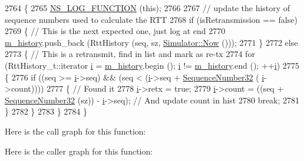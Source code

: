 \begin{DoxyCode}
2764 \{
2765   \hyperlink{log-macros-disabled_8h_a90b90d5bad1f39cb1b64923ea94c0761}{NS\_LOG\_FUNCTION} (\textcolor{keyword}{this});
2766 
2767   \textcolor{comment}{// update the history of sequence numbers used to calculate the RTT}
2768   \textcolor{keywordflow}{if} (isRetransmission == \textcolor{keyword}{false})
2769     \{ \textcolor{comment}{// This is the next expected one, just log at end}
2770       \hyperlink{classns3_1_1TcpSocketBase_a6d6853c108db3acb5b43ee855bd1f805}{m\_history}.push\_back (RttHistory (seq, sz, \hyperlink{classns3_1_1Simulator_ac3178fa975b419f7875e7105be122800}{Simulator::Now} ()));
2771     \}
2772   \textcolor{keywordflow}{else}
2773     \{ \textcolor{comment}{// This is a retransmit, find in list and mark as re-tx}
2774       \textcolor{keywordflow}{for} (RttHistory\_t::iterator \hyperlink{bernuolliDistribution_8m_a6f6ccfcf58b31cb6412107d9d5281426}{i} = \hyperlink{classns3_1_1TcpSocketBase_a6d6853c108db3acb5b43ee855bd1f805}{m\_history}.begin (); \hyperlink{bernuolliDistribution_8m_a6f6ccfcf58b31cb6412107d9d5281426}{i} != 
      \hyperlink{classns3_1_1TcpSocketBase_a6d6853c108db3acb5b43ee855bd1f805}{m\_history}.end (); ++\hyperlink{bernuolliDistribution_8m_a6f6ccfcf58b31cb6412107d9d5281426}{i})
2775         \{
2776           \textcolor{keywordflow}{if} ((seq >= \hyperlink{bernuolliDistribution_8m_a6f6ccfcf58b31cb6412107d9d5281426}{i}->seq) && (seq < (\hyperlink{bernuolliDistribution_8m_a6f6ccfcf58b31cb6412107d9d5281426}{i}->seq + \hyperlink{group__network_gacb2070e4e98d2d5135c9bede58f07a03}{SequenceNumber32} (
      \hyperlink{bernuolliDistribution_8m_a6f6ccfcf58b31cb6412107d9d5281426}{i}->count))))
2777             \{ \textcolor{comment}{// Found it}
2778               \hyperlink{bernuolliDistribution_8m_a6f6ccfcf58b31cb6412107d9d5281426}{i}->retx = \textcolor{keyword}{true};
2779               \hyperlink{bernuolliDistribution_8m_a6f6ccfcf58b31cb6412107d9d5281426}{i}->count = ((seq + \hyperlink{group__network_gacb2070e4e98d2d5135c9bede58f07a03}{SequenceNumber32} (sz)) - \hyperlink{bernuolliDistribution_8m_a6f6ccfcf58b31cb6412107d9d5281426}{i}->seq); \textcolor{comment}{// And update count in
       hist}
2780               \textcolor{keywordflow}{break};
2781             \}
2782         \}
2783     \}
2784 \}
\end{DoxyCode}


Here is the call graph for this function\+:




Here is the caller graph for this function\+:


